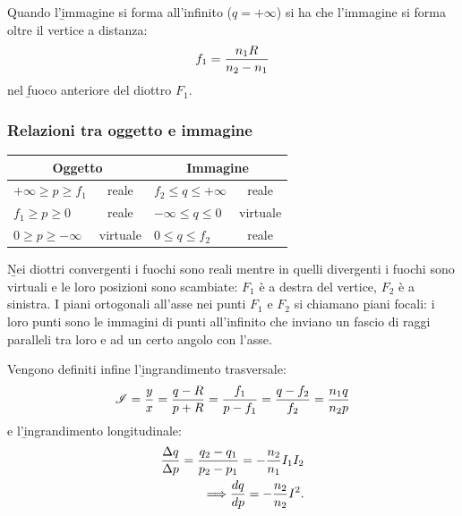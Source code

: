 Quando l'\b{immagine si forma all'infinito} ($q=+\infty$) si ha che l'immagine si forma oltre il vertice a distanza:
\begin{equation}\begin{split}
f_1=\frac{n_1R}{n_2-n_1}
\end{split}\end{equation}
nel \b{fuoco anteriore} del diottro $F_1$.

\subsubsection{Relazioni tra oggetto e immagine}
\begin{center}
\begin{tabularx}{\textwidth}{Xc| Xc}
\toprule
\multicolumn{2}{c}{Oggetto} 			& \multicolumn{2}{c}{Immagine} 	\\
\midrule
$+\infty\ge p\ge f_1$ 		& reale 		& $f_2\le q\le +\infty$ 			& reale\\[2ex]
$f_1\ge p\ge 0$ 			& reale 		& $-\infty\le q\le 0$ 			& virtuale\\[2ex]
$0\ge p\ge -\infty$ 		& virtuale 		& $0\le q \le f_2$ 			& reale\\[2ex]
\bottomrule
\end{tabularx}
\end{center}

\b{Nei diottri convergenti i fuochi sono reali mentre in quelli divergenti i fuochi sono virtuali e le loro posizioni sono scambiate}: $F_1$ è a destra del vertice, $F_2$ è a sinistra. I piani ortogonali all'asse nei punti $F_1$ e $F_2$ si chiamano \b{piani focali}: i loro punti sono le immagini di punti all'infinito che inviano un fascio di raggi paralleli tra loro e ad un certo angolo con l'asse.

Vengono definiti infine l'\b{ingrandimento trasversale}:
\begin{equation}\begin{split}
\mathcal{I}=\frac{y}{x}=\frac{q-R}{p+R}=\frac{f_1}{p-f_1}=\frac{q-f_2}{f_2}=\frac{n_1q}{n_2p}
\end{split}\end{equation}
e l'\b{ingrandimento longitudinale}:
\begin{equation}\begin{split}
\frac{\Delta q}{\Delta p}=\frac{q_2-q_1}{p_2-p_1}=-\frac{n_2}{n_1}I_1I_2\\
\Longrightarrow \frac{dq}{dp}=-\frac{n_2}{n_2}I^2.
\end{split}\end{equation}

